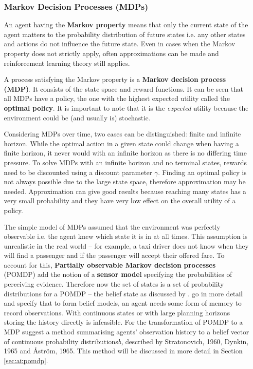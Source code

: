 \subsubsection{Markov Decision Processes (MDPs)}
\label{sec:ai:mdp}

An agent having the \textbf{Markov property} means that only the current state
of the agent matters to the probability distribution of future states i.e. any
other states and actions do not influence the future state. Even in cases when
the Markov property does not strictly apply, often approximations can be made
and reinforcement learning theory still applies.
\parencite{Sutton1998ai+reinforcement}

A process satisfying the Markov property is a
\textbf{Markov decision process (MDP)}. It consists of the state space and
reward functions. It can be seen that all MDPs have a policy, the one with the
highest expected utility called the \textbf{optimal policy}. It is important to
note that it is the \textit{expected} utility because the environment could be
(and usually is) stochastic. \parencite{Russell2010ai+modern}

Considering MDPs over time, two cases can be distinguished: finite and infinite
horizon. While the optimal action in a given state could change when having a
finite horizon, it never would with an infinite horizon as there is no
differing time pressure. To solve MDPs with an infinite horizon and no terminal
states, rewards need to be discounted using a discount parameter \(\gamma\).
Finding an optimal policy is not always possible due to the large state space,
therefore approximation may be needed. Approximation can give good results
because reaching many states has a very small probability and they have very
low effect on the overall utility of a policy. \parencite{Russell2010ai+modern}

The simple model of MDPs assumed that the environment was perfectly observable
i.e. the agent knew which state it is in at all times. This assumption is
unrealistic in the real world -- for example, a taxi driver does not know when
they will find a passenger and if the passenger will accept their offered fare.
To account for this, \textbf{Partially observable Markov decision processes}
(POMDP) add the notion of a \textbf{sensor model} specifying the probabilities
of perceiving evidence. Therefore now the set of states is a set of probability
distributions for a POMDP -- the belief state as discussed by
\textcite{Russell2010ai+modern}. \textcite{Spaan2012ai+pomdp} go in more detail
and specify that to form belief models, an agent needs some form of memory to
record observations. With continuous states or with large planning horizons
storing the history directly is infeasible. For the transformation of POMDP to
a MDP \textcite{Spaan2012ai+pomdp} suggest a method summarising agents'
observation history to a belief vector of continuous probability
distributions\(b\), described by Stratonovich, 1960, Dynkin, 1965 and Åström,
1965. This method will be discussed in more detail in Section
\ref{sec:ai:pomdp}.


